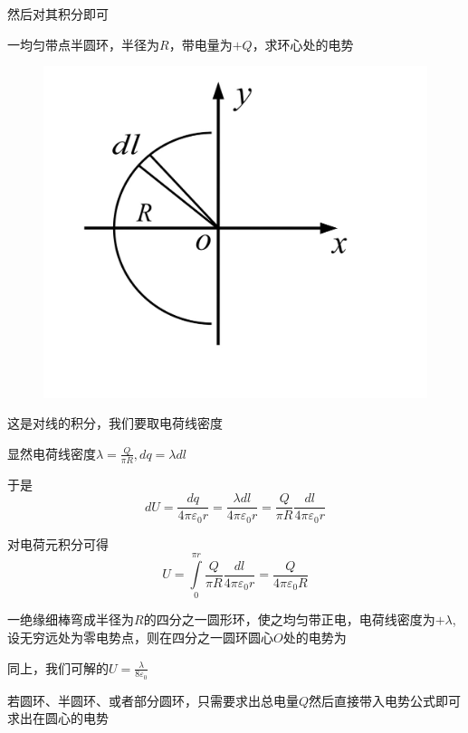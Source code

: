 \documentclass[lang=cn,10pt]{elegantbook}
\begin{document}
		然后对其积分即可
		\begin{example}
			一均匀带点半圆环，半径为$R$，带电量为$+Q$，求环心处的电势
\begin{figure}[H]
	\centering
	\includegraphics[width=0.18\linewidth]{image/IMG_0416(20231117-173212)}
	\caption{}
	\label{fig:img041620231117-173212}
\end{figure}
		\end{example}
		\begin{solution}
			这是对线的积分，我们要取电荷线密度
			
			显然电荷线密度$\lambda=\frac{Q}{\pi R},dq=\lambda dl$
			
			于是
			\begin{equation*}
				dU=\frac{dq}{4\pi\varepsilon_{0}r}=\frac{\lambda dl}{4\pi\varepsilon_{0}r}=\frac{Q}{\pi R}\frac{ dl}{4\pi\varepsilon_{0}r}
			\end{equation*}
		
			对电荷元积分可得
			\begin{equation*}
				U=\int\limits_0^{\pi r}{\frac{Q}{\pi R}\frac{dl}{4\pi \varepsilon _0r}}=\frac{Q}{4\pi \varepsilon _0R}
			\end{equation*}
		\end{solution}
		\begin{example}
			一绝缘细棒弯成半径为$R$的四分之一圆形环，使之均匀带正电，电荷线密度为$+\lambda$,设无穷远处为零电势点，则在四分之一圆环圆心$O$处的电势为
		\end{example}
		\begin{solution}
			同上，我们可解的$U=\frac{\lambda}{8\varepsilon_{0}}$
		\end{solution}
		\begin{note}
			若圆环、半圆环、或者部分圆环，只需要求出总电量$Q$然后直接带入电势公式即可求出在圆心的电势
		\end{note}
\end{document}
